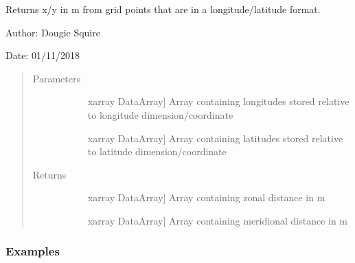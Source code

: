 \documentclass[letterpaper,10pt,english]{sphinxmanual}
\begin{document}
\begin{fulllineitems}
\label{\detokenize{utils_doc:utils.xy_from_lonlat}}
Returns x/y in m from grid points that are in a longitude/latitude format.

\begin{DUlineblock}{0em}
\item[] Author: Dougie Squire
\item[] Date: 01/11/2018
\end{DUlineblock}
\begin{quote}\begin{description}
\item[{Parameters}] \leavevmode\begin{description}
\item[{}] \leavevmode{[}xarray DataArray{]}
Array containing longitudes stored relative to longitude dimension/coordinate

\item[{}] \leavevmode{[}xarray DataArray{]}
Array containing latitudes stored relative to latitude dimension/coordinate

\end{description}

\item[{Returns}] \leavevmode\begin{description}
\item[{}] \leavevmode{[}xarray DataArray{]}
Array containing zonal distance in m

\item[{}] \leavevmode{[}xarray DataArray{]}
Array containing meridional distance in m

\end{description}

\end{description}\end{quote}
\subsubsection*{Examples}


\end{fulllineitems}
\end{document}
